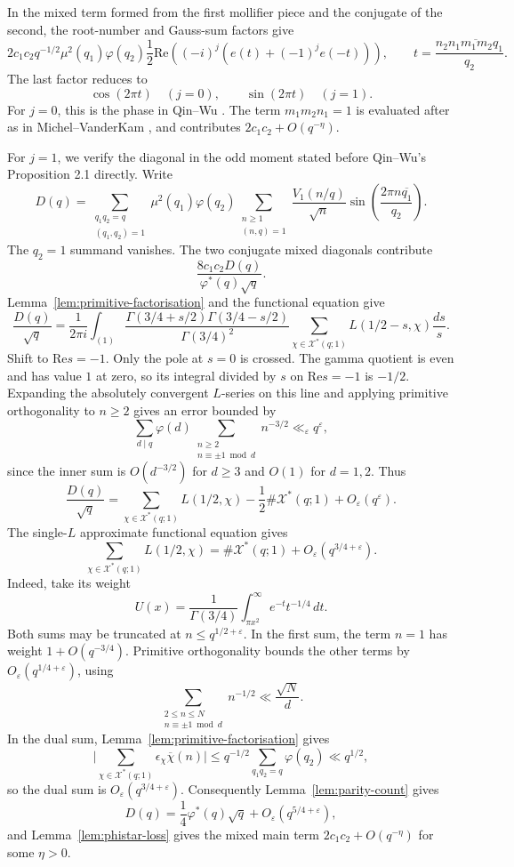 \documentclass[12pt, a4paper]{amsart}
\numberwithin{equation}{section}
\newcommand{\e}{e}
\renewcommand{\Re}{\mathrm{Re}}
\renewcommand{\le}{\leqslant}
\renewcommand{\ge}{\geqslant}
\theoremstyle{plain}
\begin{document}
In the mixed term formed from the first mollifier piece and the conjugate of the second, the root-number and Gauss-sum factors give
$$
2c_1c_2 q^{-1/2}\mu^2(q_1)\varphi(q_2)
\frac12\Re\left((-i)^j
\left(\e(t)+(-1)^j\e(-t)\right)\right),
\qquad
t=\frac{n_2\overline{n_1m_1m_2q_1}}{q_2}.
$$
The last factor reduces to
$$
\cos(2\pi t)\quad(j=0),
\qquad
\sin(2\pi t)\quad(j=1).
$$
For $j=0$, this is the phase in Qin--Wu \cite[(3.2)--(3.4)]{QW}. The term $m_1m_2n_1=1$ is evaluated after \cite[(3.4)]{QW} as in Michel--VanderKam \cite[Section 6.1]{MV}, and contributes $2c_1c_2+O(q^{-\eta})$.

For $j=1$, we verify the diagonal in the odd moment stated before Qin--Wu's Proposition 2.1 \cite[p.~5]{QW} directly. Write
$$
D(q)=
\sum_{\substack{q_1q_2=q\\(q_1,q_2)=1}}
\mu^2(q_1)\varphi(q_2)
\sum_{\substack{n\ge1\\(n,q)=1}}
\frac{V_1(n/q)}{\sqrt n}
\sin\left(\frac{2\pi n\overline{q_1}}{q_2}\right).
$$
The $q_2=1$ summand vanishes. The two conjugate mixed diagonals contribute
$$
\frac{8c_1c_2D(q)}{\varphi^*(q)\sqrt q}.
$$
Lemma~\ref{lem:primitive-factorisation} and the functional equation give
$$
\frac{D(q)}{\sqrt q}
=\frac1{2\pi i}\int_{(1)}
\frac{\Gamma(3/4+s/2)\Gamma(3/4-s/2)}{\Gamma(3/4)^2}
\sum_{\chi\in\mathcal X^*(q;1)}L(1/2-s,\chi)\frac{ds}{s}.
$$
Shift to $\Re s=-1$. Only the pole at $s=0$ is crossed. The gamma quotient is even and has value $1$ at zero, so its integral divided by $s$ on $\Re s=-1$ is $-1/2$. Expanding the absolutely convergent $L$-series on this line and applying primitive orthogonality to $n\ge2$ gives an error bounded by
$$
\sum_{d\mid q}\varphi(d)
\sum_{\substack{n\ge2\\n\equiv\pm1\bmod d}}n^{-3/2}
\ll_\varepsilon q^\varepsilon,
$$
since the inner sum is $O(d^{-3/2})$ for $d\ge3$ and $O(1)$ for $d=1,2$. Thus
$$
\frac{D(q)}{\sqrt q}
=\sum_{\chi\in\mathcal X^*(q;1)}L(1/2,\chi)
-\frac12\#\mathcal X^*(q;1)+O_\varepsilon(q^\varepsilon).
$$
The single-$L$ approximate functional equation gives
$$
\sum_{\chi\in\mathcal X^*(q;1)}L(1/2,\chi)
=\#\mathcal X^*(q;1)+O_\varepsilon(q^{3/4+\varepsilon}).
$$
Indeed, take its weight
$$
U(x)=\frac{1}{\Gamma(3/4)}\int_{\pi x^2}^{\infty}e^{-t}t^{-1/4}\,dt.
$$
Both sums may be truncated at $n\le q^{1/2+\varepsilon}$. In the first sum, the term $n=1$ has weight $1+O(q^{-3/4})$. Primitive orthogonality bounds the other terms by $O_\varepsilon(q^{1/4+\varepsilon})$, using
$$
\sum_{\substack{2\le n\le N\\ n\equiv\pm1\bmod d}}n^{-1/2}\ll\frac{\sqrt N}{d}.
$$
In the dual sum, Lemma~\ref{lem:primitive-factorisation} gives
$$
\biggl|\sum_{\chi\in\mathcal X^*(q;1)}\epsilon_\chi\overline\chi(n)\biggr|
\le q^{-1/2}\sum_{q_1q_2=q}\varphi(q_2)\ll q^{1/2},
$$
so the dual sum is $O_\varepsilon(q^{3/4+\varepsilon})$. Consequently Lemma~\ref{lem:parity-count} gives
$$
D(q)=\frac14\varphi^*(q)\sqrt q
+O_\varepsilon(q^{5/4+\varepsilon}),
$$
and Lemma~\ref{lem:phistar-loss} gives the mixed main term $2c_1c_2+O(q^{-\eta})$ for some $\eta>0$.
\end{document}
